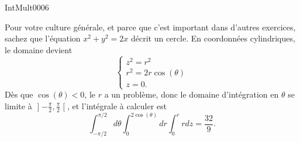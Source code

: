 
\begin{corrige}{IntMult0006}

	Pour votre culture générale, et parce que c'est important dans d'autres exercices, sachez que l'équation $x^2+y^2=2x$ décrit un cercle. En coordonnées cylindriques, le domaine devient
	\begin{equation}
		\left\{
		\begin{array}{ll}
			z^2=r^2\\
			r^2=2r\cos(\theta)\\
			z=0.
		\end{array}
		\right.
	\end{equation}
	Dès que $\cos(\theta)<0$, le $r$ a un problème, donc le domaine d'intégration en $\theta$ se limite à $\mathopen] -\frac{ \pi }{ 2 } , \frac{ \pi }{ 2 } \mathclose[$, et l'intégrale à calculer est
	\begin{equation}
		\int_{-\pi/2}^{\pi/2}d\theta\int_0^{2\cos(\theta)}dr\int_0^r rdz=\frac{ 32 }{ 9 }.
	\end{equation}

\end{corrige}
